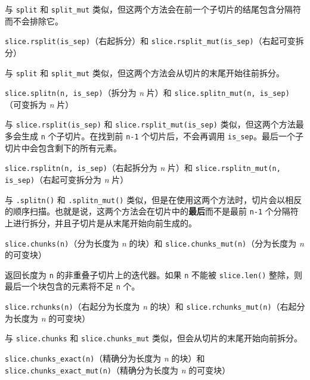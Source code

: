 与 \texttt{split} 和 \texttt{split\_mut} 类似，但这两个方法会在前一个子切片的结尾包含分隔符而不会排除它。

\begin{myNote}
\texttt{slice.rsplit(is\_sep)}（右起拆分）和 \texttt{slice.rsplit\_mut(is\_sep)}（右起可变拆分）
\end{myNote}

与 \texttt{split} 和 \texttt{split\_mut} 类似，但这两个方法会从切片的末尾开始往前拆分。

\begin{myNote}
\texttt{slice.splitn(n, is\_sep)}（拆分为 \emph{n} 片）和 \texttt{slice.splitn\_mut(n, is\_sep)}（可变拆为 \emph{n} 片）
\end{myNote}

与 \texttt{slice.rsplit(is\_sep)} 和 \texttt{slice.rsplit\_mut(is\_sep)} 类似，但这两个方法最多会生成 \texttt{n} 个子切片。在找到前 \texttt{n-1} 个切片后，不会再调用 \texttt{is\_sep}。最后一个子切片中会包含剩下的所有元素。

\begin{myNote}
\texttt{slice.rsplitn(n, is\_sep)}（右起拆分为 \emph{n} 片）和 \texttt{slice.rsplitn\_mut(n, is\_sep)}（右起可变拆分为 \emph{n} 片）
\end{myNote}

与 \texttt{.splitn()} 和 \texttt{.splitn\_mut()} 类似，但是在使用这两个方法时，切片会以相反的顺序扫描。也就是说，这两个方法会在切片中的\textbf{最后}而不是最前 \texttt{n-1} 个分隔符上进行拆分，并且子切片是从末尾开始向前生成的。

\begin{myNote}
\texttt{slice.chunks(n)}（分为长度为 \emph{n} 的块）和 \texttt{slice.chunks\_mut(n)}（分为长度为 \emph{n} 的可变块）
\end{myNote}

返回长度为 \texttt{n} 的非重叠子切片上的迭代器。如果 \texttt{n} 不能被 \texttt{slice.len()} 整除，则最后一个块包含的元素将不足 \texttt{n} 个。

\begin{myNote}
\texttt{slice.rchunks(n)}（右起分为长度为 \emph{n} 的块）和 \texttt{slice.rchunks\_mut(n)}（右起分为长度为 \emph{n} 的可变块）
\end{myNote}

与 \texttt{slice.chunks} 和 \texttt{slice.chunks\_mut} 类似，但会从切片的末尾开始向前拆分。

\begin{myNote}
\texttt{slice.chunks\_exact(n)}（精确分为长度为 \emph{n} 的块）和 \texttt{slice.chunks\_exact\_mut(n)}（精确分为长度为 \emph{n} 的可变块）
\end{myNote}

